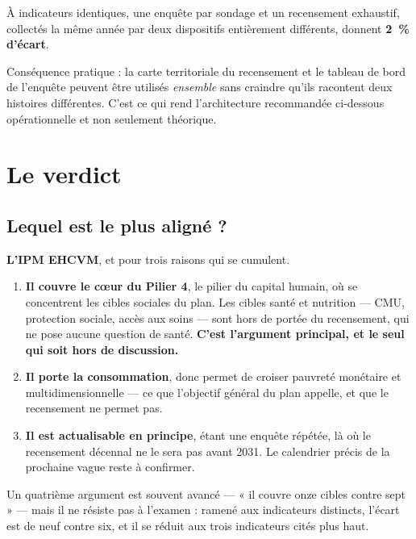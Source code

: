 \documentclass[11pt,a4paper]{article}
\begin{document}
\begin{retenir}
À indicateurs identiques, une enquête par sondage et un recensement exhaustif, collectés la même
année par deux dispositifs entièrement différents, donnent \textbf{2~\% d'écart}.

Conséquence pratique : la carte territoriale du recensement et le tableau de bord de l'enquête
peuvent être utilisés \emph{ensemble} sans craindre qu'ils racontent deux histoires différentes.
C'est ce qui rend l'architecture recommandée ci-dessous opérationnelle et non seulement
théorique.
\end{retenir}

\section{Le verdict}

\subsection{Lequel est le plus aligné ?}

\textbf{L'IPM EHCVM}, et pour trois raisons qui se cumulent.

\begin{enumerate}
  \item \textbf{Il couvre le cœur du Pilier 4}, le pilier du capital humain, où se concentrent les
        cibles sociales du plan. Les cibles santé et nutrition --- CMU, protection sociale, accès
        aux soins --- sont hors de portée du recensement, qui ne pose aucune question de santé.
        \textbf{C'est l'argument principal, et le seul qui soit hors de discussion.}
  \item \textbf{Il porte la consommation}, donc permet de croiser pauvreté monétaire et
        multidimensionnelle --- ce que l'objectif général du plan appelle, et que le recensement ne
        permet pas.
  \item \textbf{Il est actualisable en principe}, étant une enquête répétée, là où le recensement
        décennal ne le sera pas avant 2031. Le calendrier précis de la prochaine vague reste à
        confirmer.
\end{enumerate}

\noindent Un quatrième argument est souvent avancé --- « il couvre onze cibles contre sept » ---
mais il ne résiste pas à l'examen : ramené aux indicateurs distincts, l'écart est de neuf contre
six, et il se réduit aux trois indicateurs cités plus haut.
\end{document}
